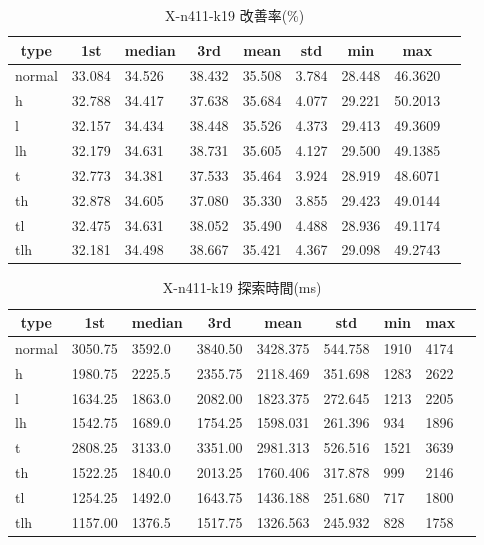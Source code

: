 \begin{table}[htbp]
    \caption{X-n411-k19 改善率(\%)}
    \begin{tabular}{|l|l|l|l|l|l|l|l|l|}\hline
    \multicolumn{1}{|c|}{\textbf{type}}
    &\multicolumn{1}{|c|}{\textbf{1st}}
    &\multicolumn{1}{c|}{\textbf{median}}
    &\multicolumn{1}{c|}{\textbf{3rd}}
    &\multicolumn{1}{c|}{\textbf{mean}}
    &\multicolumn{1}{c|}{\textbf{std}}
    &\multicolumn{1}{c|}{\textbf{min}}
    &\multicolumn{1}{c|}{\textbf{max}}\\\hline
	normal & 33.084 & 34.526 & 38.432 & 35.508 & 3.784 & 28.448 & 46.3620\\\hline
	h & 32.788 & 34.417 & 37.638 & 35.684 & 4.077 & 29.221 & 50.2013\\\hline
	l & 32.157 & 34.434 & 38.448 & 35.526 & 4.373 & 29.413 & 49.3609\\\hline
	lh & 32.179 & 34.631 & 38.731 & 35.605 & 4.127 & 29.500 & 49.1385\\\hline
	t & 32.773 & 34.381 & 37.533 & 35.464 & 3.924 & 28.919 & 48.6071\\\hline
	th & 32.878 & 34.605 & 37.080 & 35.330 & 3.855 & 29.423 & 49.0144\\\hline
	tl & 32.475 & 34.631 & 38.052 & 35.490 & 4.488 & 28.936 & 49.1174\\\hline
	tlh & 32.181 & 34.498 & 38.667 & 35.421 & 4.367 & 29.098 & 49.2743\\\hline
	\end{tabular}
\end{table}
\begin{table}[htbp]
    \caption{X-n411-k19 探索時間(ms)}
    \begin{tabular}{|l|l|l|l|l|l|l|l|l|}\hline
    \multicolumn{1}{|c|}{\textbf{type}}
    &\multicolumn{1}{|c|}{\textbf{1st}}
    &\multicolumn{1}{c|}{\textbf{median}}
    &\multicolumn{1}{c|}{\textbf{3rd}}
    &\multicolumn{1}{c|}{\textbf{mean}}
    &\multicolumn{1}{c|}{\textbf{std}}
    &\multicolumn{1}{c|}{\textbf{min}}
    &\multicolumn{1}{c|}{\textbf{max}}\\\hline
	normal & 3050.75 & 3592.0 & 3840.50 & 3428.375 & 544.758 & 1910 & 4174\\\hline
	h & 1980.75 & 2225.5 & 2355.75 & 2118.469 & 351.698 & 1283 & 2622\\\hline
	l & 1634.25 & 1863.0 & 2082.00 & 1823.375 & 272.645 & 1213 & 2205\\\hline
	lh & 1542.75 & 1689.0 & 1754.25 & 1598.031 & 261.396 & 934 & 1896\\\hline
	t & 2808.25 & 3133.0 & 3351.00 & 2981.313 & 526.516 & 1521 & 3639\\\hline
	th & 1522.25 & 1840.0 & 2013.25 & 1760.406 & 317.878 & 999 & 2146\\\hline
	tl & 1254.25 & 1492.0 & 1643.75 & 1436.188 & 251.680 & 717 & 1800\\\hline
	tlh & 1157.00 & 1376.5 & 1517.75 & 1326.563 & 245.932 & 828 & 1758\\\hline
	\end{tabular}
\end{table}
